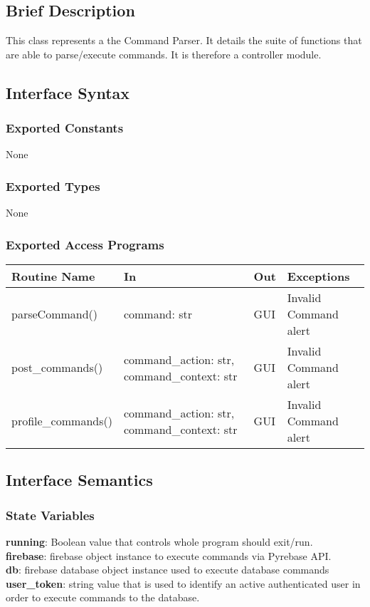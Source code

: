 \documentclass[12pt, titlepage]{article}
\begin{document}
\subsection* {Brief Description}
This class represents a the Command Parser. It details the suite of functions that are able to parse/execute commands. It is therefore a controller module.

\subsection* {Interface Syntax}
\subsubsection* {Exported Constants}
None

\subsubsection* {Exported Types}
None

\subsubsection* {Exported Access Programs}
\begin{table}[!htb]
    \centering
    \begin{tabular}{|p{3.5cm}|p{3cm}|p{3.5cm}|p{4cm}|}
        \hline
        \textbf{Routine Name} & \textbf{In} & \textbf{Out} & \textbf{Exceptions} \\
        \hline
         parseCommand() & command: str & GUI & Invalid Command alert\\
        \hline
         post\_commands() & command\_action: str, command\_context: str  & GUI & Invalid Command alert\\
        \hline
         profile\_commands() & command\_action: str, command\_context: str  & GUI & Invalid Command alert\\
        \hline
    \end{tabular}
\end{table}

\subsection{Interface Semantics}
\subsubsection{State Variables}
\textbf{running}: Boolean value that controls whole program should exit/run.\\
\textbf{firebase}: firebase object instance to execute commands via Pyrebase API.\\
\textbf{db}: firebase database object instance used to execute database commands\\
\textbf{user\_token}: string value that is used to identify an active authenticated user in order to execute commands to the database.
\end{document}
